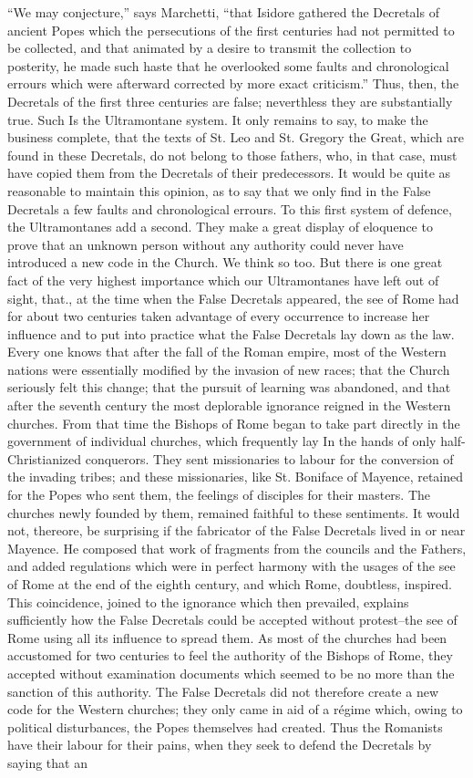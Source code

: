 “We may conjecture,” says Marchetti, “that Isidore gathered the Decretals of ancient Popes which the persecutions of the first centuries had not permitted to be collected, and that animated by a desire to transmit the collection to posterity, he made such haste that he overlooked some faults and chronological errours which were afterward corrected by more exact criticism.” Thus, then, the Decretals of the first three centuries are false; neverthless they are substantially true. Such Is the Ultramontane system. It only remains to say, to make the business complete, that the texts of St. Leo and St. Gregory the Great, which are found in these Decretals, do not belong to those fathers, who, in that case, must have copied them from the Decretals of their predecessors. It would be quite as reasonable to maintain this opinion, as to say that we only find in the False Decretals a few faults and chronological errours. To this first system of defence, the Ultramontanes add a second. They make a great display of eloquence to prove that an unknown person without any authority could never have introduced a new code in the Church. We think so too. But there is one great fact of the very highest importance which our Ultramontanes have left out of sight, that., at the time when the False Decretals appeared, the see of Rome had for about two centuries taken advantage of every occurrence to increase her influence and to put into practice what the False Decretals lay down as the law. Every one knows that after the fall of the Roman empire, most of the Western nations were essentially modified by the invasion of new races; that the Church seriously felt this change; that the pursuit of learning was abandoned, and that after the seventh century the most deplorable ignorance reigned in the Western churches. From that time the Bishops of Rome began to take part directly in the government of individual churches, which frequently lay In the hands of only half-Christianized conquerors. They sent missionaries to labour for the conversion of the invading tribes; and these missionaries, like St. Boniface of Mayence, retained for the Popes who sent them, the feelings of disciples for their masters. The churches newly founded by them, remained faithful to these sentiments. It would not, thereore, be surprising if the fabricator of the False Decretals lived in or near Mayence. He composed that work of fragments from the councils and the Fathers, and added regulations which were in perfect harmony with the usages of the see of Rome at the end of the eighth century, and which Rome, doubtless, inspired. This coincidence, joined to the ignorance which then prevailed, explains sufficiently how the False Decretals could be accepted without protest--the see of Rome using all its influence to spread them. As most of the churches had been accustomed for two centuries to feel the authority of the Bishops of Rome, they accepted without examination documents which seemed to be no more than the sanction of this authority. The False Decretals did not therefore create a new code for the Western churches; they only came in aid of a régime which, owing to political disturbances, the Popes themselves had created. Thus the Romanists have their labour for their pains, when they seek to defend the Decretals by saying that an 
